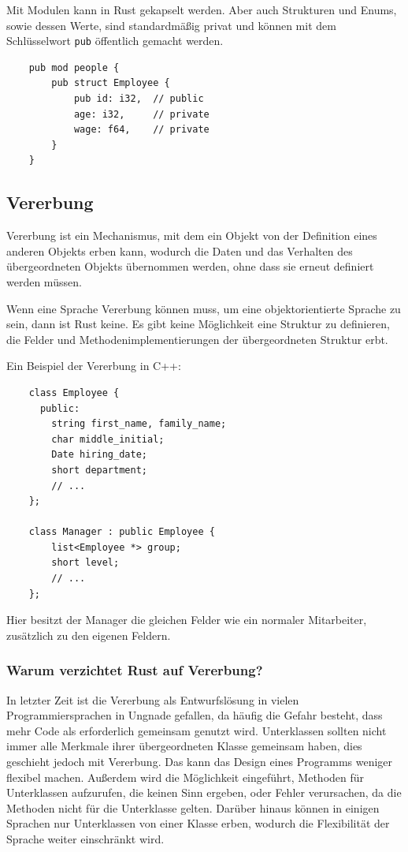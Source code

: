 Mit Modulen kann in Rust gekapselt werden. Aber auch Strukturen und Enums, sowie dessen Werte, sind standardmäßig privat und können mit dem Schlüsselwort \verb"pub" öffentlich gemacht werden.

\begin{lstlisting}
    pub mod people {
        pub struct Employee {
            pub id: i32,  // public
            age: i32,     // private
            wage: f64,    // private
        }
    }
\end{lstlisting}

\subsection{Vererbung}

Vererbung ist ein Mechanismus, mit dem ein Objekt von der Definition eines anderen Objekts erben kann, wodurch die Daten und das Verhalten des über\-ge\-ord\-ne\-ten Objekts übernommen werden, ohne dass sie erneut definiert werden müssen.

Wenn eine Sprache Vererbung können muss, um eine objektorientierte Sprache zu sein, dann ist Rust keine. Es gibt keine Möglichkeit eine Struktur zu definieren, die Felder und Methodenimplementierungen der übergeordneten Struktur erbt.

Ein Beispiel der Vererbung in C++:

\begin{lstlisting}
    class Employee {
      public:
        string first_name, family_name;
        char middle_initial;
        Date hiring_date;
        short department;
        // ...
    };

    class Manager : public Employee {
        list<Employee *> group;
        short level;
        // ...
    };
\end{lstlisting}

Hier besitzt der Manager die gleichen Felder wie ein normaler Mitarbeiter, zu\-sätz\-lich zu den eigenen Feldern.

\subsubsection{Warum verzichtet Rust auf Vererbung?}

In letzter Zeit ist die Vererbung als Entwurfslösung in vielen Programmiersprachen in Ungnade gefallen, da häufig die Gefahr besteht, dass mehr Code als erforderlich gemeinsam genutzt wird. Unterklassen sollten nicht immer alle Merkmale ihrer übergeordneten Klasse gemeinsam haben, dies geschieht jedoch mit Vererbung. Das kann das Design eines Programms weniger flexibel machen. Außerdem wird die Möglichkeit eingeführt, Methoden für Unterklassen aufzurufen, die keinen Sinn ergeben, oder Fehler verursachen, da die Methoden nicht für die Unterklasse gelten. Darüber hinaus können in einigen Sprachen nur Unterklassen von einer Klasse erben, wodurch die Flexibilität der Sprache weiter einschränkt wird.

